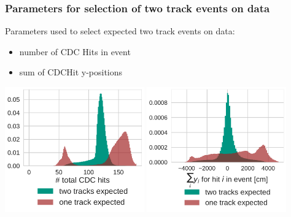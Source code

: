 \documentclass[18pt]{beamer}
\begin{document}
\begin{frame}
  \frametitle{Parameters for selection of  two track events on data}
  Parameters used to select expected two track events on data:
  \begin{itemize}
  \item number of CDC Hits in event
  \item sum of CDCHit y-positions
  \end{itemize}
  \begin{center}
    \includegraphics[width=0.45\textwidth]{figures/mcsplit_analysis/total_cdc_hits_gcraugust_30cm_split.pdf}
    \includegraphics[width=0.45\textwidth]{figures/mcsplit_analysis/sum_y_distribution_gcraugust_30cm_split.pdf}
  \end{center}
\end{frame}
  
\end{document}
